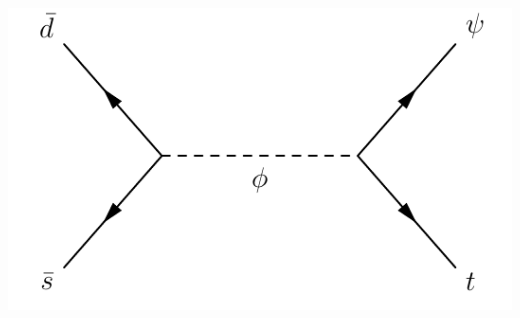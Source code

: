 \documentclass[aspectratio=169,xcolor=dvipsnames,,table,compress]{beamer}
\begin{document}
\begin{frame}[t]
\begin{columns}[T]
\begin{column}{0.35\textwidth}
{        %
        \includegraphics[width=\textwidth]{../figures/monotop/diagrams/resonant.pdf} \\
      }
  \end{column}
  \end{columns}
\end{frame}
\end{document}
